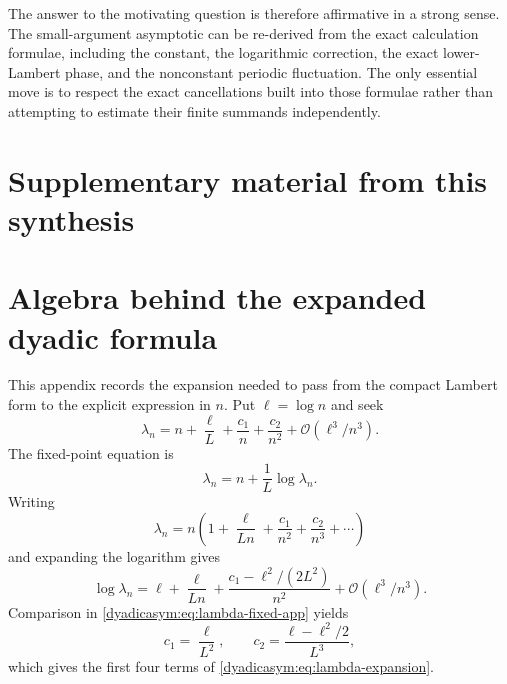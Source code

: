 \documentclass[11pt,oneside]{article}
\theoremstyle{definition}
\theoremstyle{remark}
\newcommand{\bigO}{\mathcal O}
\begin{document}
The answer to the motivating question is therefore affirmative in a strong sense.  The
small-argument asymptotic can be re-derived from the exact calculation formulae, including the
constant, the logarithmic correction, the exact lower-Lambert phase, and the nonconstant
periodic fluctuation.  The only essential move is to respect the exact cancellations built
into those formulae rather than attempting to estimate their finite summands independently.

\clearpage
\section*{Supplementary material from this synthesis}
\section{Algebra behind the expanded dyadic formula}
\label{dyadicasym:app:algebra}

This appendix records the expansion needed to pass from the compact Lambert form to the
explicit expression in $n$.  Put $\ell=\log n$ and seek
\begin{equation}
 \lambda_n=n+\frac\ell L+\frac{c_1}{n}+\frac{c_2}{n^2}
 +\bigO(\ell^3/n^3).                                       \label{dyadicasym:eq:lambda-ansatz}
\end{equation}
The fixed-point equation is
\begin{equation}
 \lambda_n=n+\frac1L\log\lambda_n.                         \label{dyadicasym:eq:lambda-fixed-app}
\end{equation}
Writing
\begin{equation*}
 \lambda_n=n\left(1+\frac\ell{Ln}+\frac{c_1}{n^2}
 +\frac{c_2}{n^3}+\cdots\right)
\end{equation*}
and expanding the logarithm gives
\begin{equation*}
 \log\lambda_n=
 \ell+\frac\ell{Ln}+\frac{c_1-\ell^2/(2L^2)}{n^2}
 +\bigO(\ell^3/n^3).
\end{equation*}
Comparison in \eqref{dyadicasym:eq:lambda-fixed-app} yields
\begin{equation}
 c_1=\frac\ell{L^2},
 \qquad
 c_2=\frac{\ell-\ell^2/2}{L^3},                            \label{dyadicasym:eq:c1-c2}
\end{equation}
which gives the first four terms of \eqref{dyadicasym:eq:lambda-expansion}.
\end{document}
